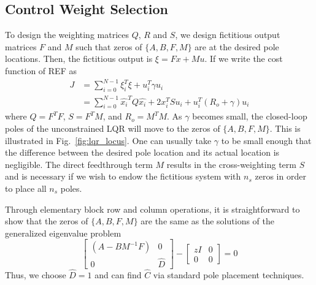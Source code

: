 \documentclass[journal,twocolumn,twoside]{IEEEtran}
\begin{document}
\subsection{Control Weight Selection}
To design the weighting matrices $Q$, $R$ and $S$, we design fictitious output matrices $F$ and $M$ such that zeros of $\{A, B, F, M\}$ are at the desired pole locations. Then, the fictitious output is $\xi = F x + M u$. If we write the cost function of REF as
\begin{align}
  J &= \sum_{i=0}^{N-1} \xi_i^T\xi + u_i^T\gamma u_i\\
    &= \sum_{i=0}^{N-1} \hat{x_i}^TQ\hat{x_i} + 2x_i^TSu_i + u_i^T(R_o+\gamma)u_i
\end{align}
where $Q = F^TF$, $S =F^TM$, and $R_o = M^TM$. As $\gamma$ becomes small, the closed-loop poles of the unconstrained LQR will move to the zeros of $\{A, B, F, M\}$. This is illustrated in Fig.~\ref{fig:lqr_locus}. One can usually take $\gamma$ to be small enough that the difference between the desired pole location and its actual location is negligible. The direct feedthrough term $M$ results in the cross-weighting term $S$ and is necessary if we wish to endow the fictitious system with $n_s$ zeros in order to place all $n_s$ poles.

Through elementary block row and column operations, it is straightforward to show that the zeros of
$\{A, B, F, M\}$ are the same as the solutions of the generalized eigenvalue problem
\begin{equation}
  \begin{bmatrix}
    (A - BM^{-1}F) & 0\\
    0 & \hat{D}
  \end{bmatrix} - \begin{bmatrix}zI & 0\\0 & 0\end{bmatrix} = 0
\end{equation}
Thus, we choose $\hat D = 1$ and can find $\hat C$ via standard pole placement techniques.

\begin{figure*}
  \begin{minipage}{0.48\textwidth}
  
  \caption{Root locus for $R_o + \gamma$. Note that for clarity, the plant zeros are not shown. The black 'x's indicate the poles of the open-loop plant. The blue circles indicate the fictitious zeros, which are at the location of the desired poles. }
  \label{fig:lqr_locus}
\end{minipage}
\hfill
\begin{minipage}{0.48\textwidth}
  
  \caption{Root locus for $R_o + \gamma$. Note that for clarity, the plant zeros are not shown. The black 'x's indicate the poles of the open-loop plant. The blue circles indicate the fictitious zeros, which are at the location of the desired poles. }
  \label{fig:lqr_locus}
\end{minipage}
\end{figure*}
\end{document}

